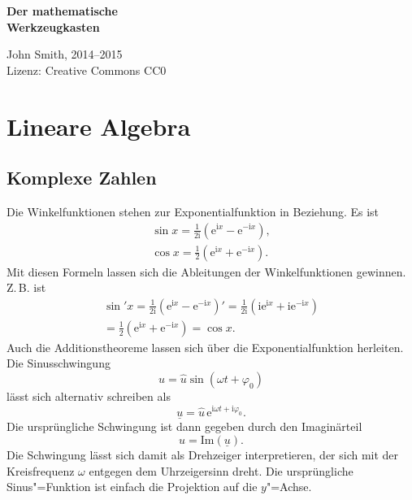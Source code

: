 \documentclass[a4paper,10pt,fleqn,twocolumn,twoside]{article}
\numberwithin{equation}{section}
\newcommand{\ui}{\mathrm i}
\newcommand{\ee}{\mathrm e}
\begin{document}

\begin{huge}
\noindent
\textbf{Der mathematische\\
Werkzeugkasten}
\par
\end{huge}
\vspace{1em}
\noindent
John Smith, 2014--2015\\
Lizenz: Creative Commons CC0

\tableofcontents



\newpage
\section{Lineare Algebra}
\subsection{Komplexe Zahlen}

Die Winkelfunktionen stehen zur Exponentialfunktion
in Beziehung. Es ist
\begin{gather}
\sin x = \frac{1}{2\ui}(\mathrm{e}^{\ui x}-\mathrm{e}^{-\ui x}),\\
\cos x = \frac{1}{2}(\mathrm{e}^{\ui x}+\mathrm{e}^{-\ui x}).
\end{gather}
Mit diesen Formeln lassen sich die Ableitungen der Winkelfunktionen
gewinnen. Z.\,B. ist
\begin{gather}
\sin' x = \frac{1}{2\ui}(\ee^{\ui x}-\ee^{-\ui x})'
= \frac{1}{2\ui}(\ui\ee^{\ui x}+\ui\ee^{-\ui x})\\
= \frac{1}{2}(\ee^{\ui x}+\ee^{-\ui x})
= \cos x.
\end{gather}
Auch die Additionstheoreme lassen sich über die Exponentialfunktion
herleiten. Die Sinusschwingung
\begin{equation}
u = \hat u\sin(\omega t+\varphi_0)
\end{equation}
lässt sich alternativ schreiben als
\begin{equation}
\underline u = \hat u\,\ee^{\ui\omega t+\ui\varphi_0}.
\end{equation}
Die ursprüngliche Schwingung ist dann gegeben durch den Imaginärteil
\begin{equation}
u = \mathrm{Im}(\underline u).
\end{equation}
Die Schwingung lässt sich damit als Drehzeiger interpretieren, der
sich mit der Kreisfrequenz $\omega$ entgegen dem Uhrzeigersinn
dreht. Die ursprüngliche Sinus"=Funktion ist einfach die Projektion
auf die $y$"=Achse.
\end{document}
